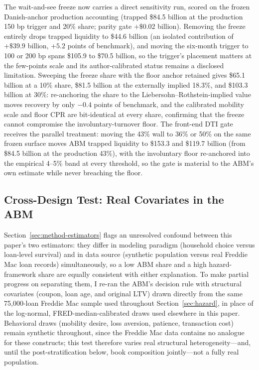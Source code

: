 \documentclass[12pt]{article}
\begin{document}
The wait-and-see freeze now carries a direct sensitivity run, scored on the frozen Danish-anchor production accounting (trapped \$84.5 billion at the production 150 bp trigger and 20\% share; parity gate $+\$0.02$ billion). Removing the freeze entirely drops trapped liquidity to \$44.6 billion (an isolated contribution of $+\$39.9$ billion, $+5.2$ points of benchmark), and moving the six-month trigger to 100 or 200 bp spans \$105.9 to \$70.5 billion, so the trigger's placement matters at the few-points scale and its author-calibrated status remains a disclosed limitation. Sweeping the freeze share with the floor anchor retained gives \$65.1 billion at a 10\% share, \$81.5 billion at the externally implied 18.3\%, and \$103.3 billion at 30\%: re-anchoring the share to the Liebersohn--Rothstein-implied value moves recovery by only $-0.4$ points of benchmark, and the calibrated mobility scale and floor CPR are bit-identical at every share, confirming that the freeze cannot compromise the involuntary-turnover floor. The front-end DTI gate receives the parallel treatment: moving the 43\% wall to 36\% or 50\% on the same frozen surface moves ABM trapped liquidity to \$153.3 and \$119.7 billion (from \$84.5 billion at the production 43\%), with the involuntary floor re-anchored into the empirical 4--5\% band at every threshold, so the gate is material to the ABM's own estimate while never breaching the floor.

\subsection{Cross-Design Test: Real Covariates in the ABM}\label{sec:robustness-crossdesign}

Section~\ref{sec:method-estimators} flags an unresolved confound between this paper's two estimators: they differ in modeling paradigm (household choice versus loan-level survival) and in data source (synthetic population versus real Freddie Mac loan records) simultaneously, so a low ABM share and a high hazard-framework share are equally consistent with either explanation. To make partial progress on separating them, I re-ran the ABM's decision rule with structural covariates (coupon, loan age, and original LTV) drawn directly from the same 75,000-loan Freddie Mac sample used throughout Section~\ref{sec:hazard}, in place of the log-normal, FRED-median-calibrated draws used elsewhere in this paper. Behavioral draws (mobility desire, loss aversion, patience, transaction cost) remain synthetic throughout, since the Freddie Mac data contains no analogue for these constructs; this test therefore varies real structural heterogeneity---and, until the post-stratification below, book composition jointly---not a fully real population.
\end{document}
